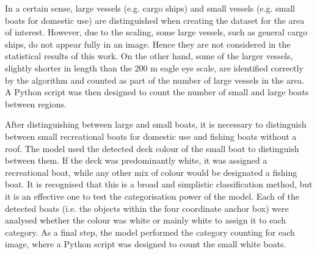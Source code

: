 In a certain sense, large vessels (e.g. cargo ships) and small vessels (e.g. small boats for domestic use) are distinguished when creating the dataset for the area of interest. However, due to the scaling, some large vessels, such as general cargo ships, do not appear fully in an image. Hence they are not considered in the statistical results of this work. On the other hand, some of the larger vessels, slightly shorter in length than the 200 m eagle eye scale, are identified correctly by the algorithm and counted as part of the number of large vessels in the area. A Python script was then designed to count the number of small and large boats between regions.

After distinguishing between large and small boats, it is necessary to distinguish between small recreational boats for domestic use and fishing boats without a roof. The model used the detected deck colour of the small boat to distinguish between them. If the deck was predominantly white, it was assigned a recreational boat, while any other mix of colour would be designated a fishing boat. It is recognised that this is a broad and simplistic classification method, but it is an effective one to test the categorisation power of the model. Each of the detected boats (i.e. the objects within the four coordinate anchor box) were analysed whether the colour was white or mainly white to assign it to each category. As a final step, the model performed the category counting for each image, where a Python script was designed to count the small white boats.
